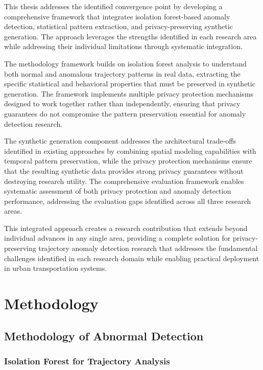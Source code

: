 \documentclass[runningheads]{llncs}
\begin{document}
This thesis addresses the identified convergence point by developing a comprehensive framework that integrates isolation forest-based anomaly detection, statistical pattern extraction, and privacy-preserving synthetic generation. The approach leverages the strengths identified in each research area while addressing their individual limitations through systematic integration.

The methodology framework builds on isolation forest analysis to understand both normal and anomalous trajectory patterns in real data, extracting the specific statistical and behavioral properties that must be preserved in synthetic generation. The framework implements multiple privacy protection mechanisms designed to work together rather than independently, ensuring that privacy guarantees do not compromise the pattern preservation essential for anomaly detection research.

The synthetic generation component addresses the architectural trade-offs identified in existing approaches by combining spatial modeling capabilities with temporal pattern preservation, while the privacy protection mechanisms ensure that the resulting synthetic data provides strong privacy guarantees without destroying research utility. The comprehensive evaluation framework enables systematic assessment of both privacy protection and anomaly detection performance, addressing the evaluation gaps identified across all three research areas.

This integrated approach creates a research contribution that extends beyond individual advances in any single area, providing a complete solution for privacy-preserving trajectory anomaly detection research that addresses the fundamental challenges identified in each research domain while enabling practical deployment in urban transportation systems.

\section{Methodology}
\label{sec:methodology}

\subsection{Methodology of Abnormal Detection}
\label{sec:abnormal-detection}

\subsubsection{Isolation Forest for Trajectory Analysis}
\label{sec:iso}
\end{document}

